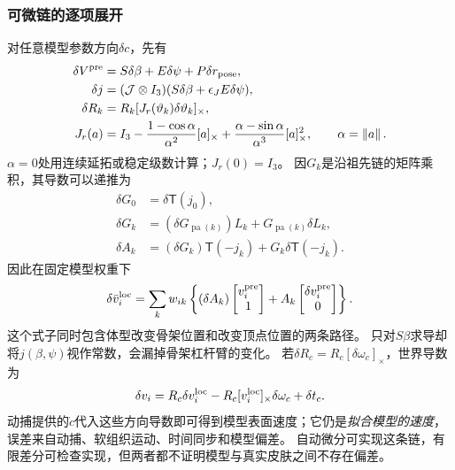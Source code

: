 \documentclass[11pt,a4paper]{article}
\numberwithin{equation}{section}
\theoremstyle{definition}
\newcommand{\norm}[1]{\left\lVert#1\right\rVert}
\begin{document}
\subsubsection{可微链的逐项展开}
对任意模型参数方向$\delta c$，先有
\begin{align}
 \delta V^{\rm pre}&=S\delta\beta+E\delta\psi
                +P\delta r_{\rm pose},\\
 \delta j&=(\mathcal J\otimes I_3)
                 (S\delta\beta+\epsilon_J E\delta\psi),\\
 \delta R_k&=R_k[J_r(\vartheta_k)\delta\vartheta_k]_\times,\\
 J_r(a)&=I_3-\frac{1-\cos\alpha}{\alpha^2}[a]_\times
             +\frac{\alpha-\sin\alpha}{\alpha^3}[a]_\times^2,
 \qquad \alpha=\norm{a}.
 \label{geo:eq:rotation-differential}
\end{align}
$\alpha=0$处用连续延拓或稳定级数计算；$J_r(0)=I_3$。
因$G_k$是沿祖先链的矩阵乘积，其导数可以递推为
\begin{align}
 \delta G_0&=\delta\mathsf T(j_0),\\
 \delta G_k&=(\delta G_{\operatorname{pa}(k)})L_k
                   +G_{\operatorname{pa}(k)}\delta L_k,\\
 \delta A_k&=(\delta G_k)\mathsf T(-j_k)
                   +G_k\delta\mathsf T(-j_k).
 \label{geo:eq:kinematic-differential}
\end{align}
因此在固定模型权重下
\begin{equation}
 \delta\bar v_i^{\rm loc}
 =\sum_k w_{ik}\left\{
       (\delta A_k)\begin{bmatrix}v_i^{\rm pre}\\1\end{bmatrix}
       +A_k\begin{bmatrix}\delta v_i^{\rm pre}\\0\end{bmatrix}\right\}.
 \label{geo:eq:vertex-differential}
\end{equation}
这个式子同时包含体型改变骨架位置和改变顶点位置的两条路径。
只对$S\beta$求导却将$j(\beta,\psi)$视作常数，会漏掉骨架杠杆臂的变化。
若$\delta R_c=R_c[\delta\omega_c]_\times$，世界导数为
\begin{equation}
 \delta v_i=R_c\delta v_i^{\rm loc}
             -R_c[v_i^{\rm loc}]_\times\delta\omega_c+\delta t_c.
 \label{geo:eq:world-differential}
\end{equation}
动捕提供的$\dot c$代入这些方向导数即可得到模型表面速度；它仍是\emph{拟合模型的速度}，误差来自动捕、软组织运动、时间同步和模型偏差。
自动微分可实现这条链，有限差分可检查实现，但两者都不证明模型与真实皮肤之间不存在偏差。
\end{document}
